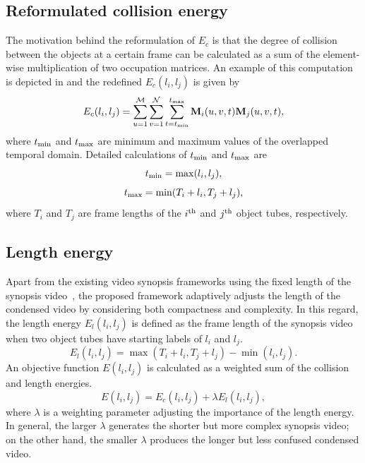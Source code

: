 \documentclass[11pt]{hyu_thesis}
\begin{document}
\subsection{Reformulated collision energy}
The motivation behind the reformulation of $E_c$ is that the degree of collision between the objects at a certain frame can be calculated as a sum of the element-wise multiplication of two occupation matrices. An example of this computation is depicted in  and the redefined $E_c(l_i,l_j)$ is given by
\begin{equation}
\label{eq:EcNew}
E_c(l_i,l_j) = \sum_{u=1}^{\mathcal{M}}\sum_{v=1}^{\mathcal{N}}\sum_{t=t_{\rm{min}}}^{t_{\rm{max}}} \textbf{M}_i(u,v,t)\textbf{M}_j(u,v,t),
\end{equation}
where $t_{\rm{min}}$ and $t_{\rm{max}}$ are minimum and maximum values of the overlapped temporal domain. Detailed calculations of $t_{\rm{min}}$ and $t_{\rm{max}}$ are
\begin{equation}
\label{eq:t_min}
t_{\rm{min}} = \max(l_i, l_j),
\end{equation}
\begin{equation}
\label{eq:t_max}
t_{\rm{max}} = \min(T_i + l_i, T_j + l_j),
\end{equation}
where $T_i$ and $T_j$ are frame lengths of the $i^{\rm{th}}$ and $j^{\rm{th}}$ object tubes, respectively.

\subsection{Length energy}
Apart from the existing video synopsis frameworks using the fixed length of the synopsis video~\cite{}, the proposed framework adaptively adjusts the length of the condensed video by considering both compactness and complexity. In this regard, the length energy $E_l (l_i,l_j)$ is defined as the frame length of the synopsis video when two object tubes have starting labels of $l_i$ and $l_j$.
\begin{equation}
\label{eq:El}
E_l(l_i, l_j) = \max(T_i + l_i, T_j + l_j) - \min(l_i, l_j).
\end{equation}
An objective function $E(l_i,l_j)$ is calculated as a weighted sum of the collision and length energies.
\begin{equation}
\label{eq:obj_func}
E(l_i, l_j) = E_c(l_i, l_j) + \lambda E_l(l_i, l_j),
\end{equation}
where $\lambda$ is a weighting parameter adjusting the importance of the length energy. In general, the larger $\lambda$ generates the shorter but more complex synopsis video; on the other hand, the smaller $\lambda$ produces the longer but less confused condensed video.
\end{document}
